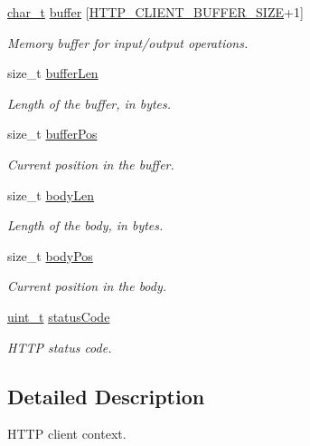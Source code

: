 \begin{DoxyCompactItemize}
\hyperlink{compiler__port_8h_a40bb5262bf908c328fbcfbe5d29d0201}{char\+\_\+t} \hyperlink{struct__HttpClientContext_a33c2de5aae0eb7ed112183775d6f3707}{buffer} \mbox{[}\hyperlink{http__client_8h_ae5dc9a5f9f9c310897f83e8f6d1c5ab3}{H\+T\+T\+P\+\_\+\+C\+L\+I\+E\+N\+T\+\_\+\+B\+U\+F\+F\+E\+R\+\_\+\+S\+I\+ZE}+1\mbox{]}
\begin{DoxyCompactList}\small\item\em Memory buffer for input/output operations. \end{DoxyCompactList}\item 
size\+\_\+t \hyperlink{struct__HttpClientContext_a11891d23e73a3d0a910ec3fa8a9490f6}{buffer\+Len}
\begin{DoxyCompactList}\small\item\em Length of the buffer, in bytes. \end{DoxyCompactList}\item 
size\+\_\+t \hyperlink{struct__HttpClientContext_add904e0a150e458ee87854d298de596d}{buffer\+Pos}
\begin{DoxyCompactList}\small\item\em Current position in the buffer. \end{DoxyCompactList}\item 
size\+\_\+t \hyperlink{struct__HttpClientContext_a3fe8ef6ae714f6d8b149e51fbb13bc7e}{body\+Len}
\begin{DoxyCompactList}\small\item\em Length of the body, in bytes. \end{DoxyCompactList}\item 
size\+\_\+t \hyperlink{struct__HttpClientContext_a5f8ac52ac53788a8a6f9806aef6ab453}{body\+Pos}
\begin{DoxyCompactList}\small\item\em Current position in the body. \end{DoxyCompactList}\item 
\hyperlink{compiler__port_8h_a12a1e9b3ce141648783a82445d02b58d}{uint\+\_\+t} \hyperlink{struct__HttpClientContext_a94026ebed0cc42147986fb486c156d61}{status\+Code}
\begin{DoxyCompactList}\small\item\em H\+T\+TP status code. \end{DoxyCompactList}\end{DoxyCompactItemize}


\subsection{Detailed Description}
H\+T\+TP client context. 

